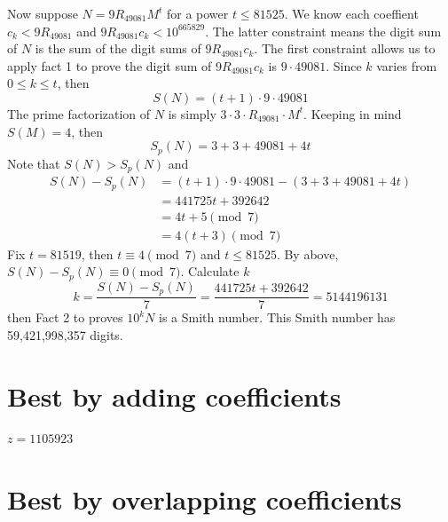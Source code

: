 \documentclass{amsart}
\newcommand{\RE}{{49081}}
\newcommand{\ME}{{665829}}
\numberwithin{equation}{section}
\theoremstyle{plain} %
\theoremstyle{definition}
\theoremstyle{remark}
\begin{document}
Now suppose $N = 9 R_{49081} M^t$ for a power $t\leq 81525$. We know each coeffient $c_k < 9R_{\RE}$ and $9 R_{\RE} c_k < 10^\ME$. The latter constraint means the digit sum of $N$ is the sum of the digit sums of $9 R_{49081} c_k$. The first constraint allows us to apply fact 1 to prove the digit sum of $ 9 R_{49081} c_k$ is $9 \cdot 49081$. Since $k$ varies from $0 \leq k \leq t$, then
$$S(N) = (t+1) \cdot 9 \cdot 49081$$
The prime factorization of $N$ is simply $3\cdot 3 \cdot R_\RE \cdot M^t$. Keeping in mind $S(M) = 4$, then
$$S_p(N) = 3 + 3 + \RE + 4t$$
Note that $S(N) > S_p(N)$ and 
\begin{align*}
S(N) - S_p(N) &= (t+1) \cdot 9 \cdot \RE - (3 + 3 + \RE + 4t) \\
&= 441725 t + 392642 \\
&= 4t +5 \pmod{7}\\
&= 4(t +3) \pmod{7}
\end{align*}
Fix $t=81519$, then $t \equiv 4 \pmod{7}$ and $t \leq 81525$. By above, $S(N) - S_p(N) \equiv 0 \pmod{7}$. Calculate $k$
$$k = \frac{ S(N) - S_p(N)}{7} = \frac{441725 t + 392642}{7} = 5144196131$$
then Fact 2 to proves $10^k N$ is a Smith number. This Smith number has 59,421,998,357 digits.
\\ 
 \section{Best by adding coefficients}
$z=1105923$
\,\\ \section{Best by overlapping coefficients}


 
\end{document}
